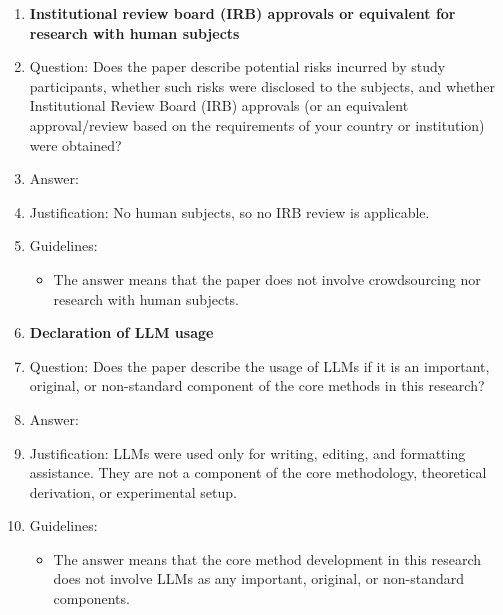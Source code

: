 \begin{enumerate}
\item {\bf Institutional review board (IRB) approvals or equivalent for research with human subjects}
    \item[] Question: Does the paper describe potential risks incurred by study participants, whether such risks were disclosed to the subjects, and whether Institutional Review Board (IRB) approvals (or an equivalent approval/review based on the requirements of your country or institution) were obtained?
    \item[] Answer: \answerNA{}
    \item[] Justification: No human subjects, so no IRB review is applicable.
    \item[] Guidelines:
    \begin{itemize}
        \item The answer \answerNA{} means that the paper does not involve crowdsourcing nor research with human subjects.
    \end{itemize}

\item {\bf Declaration of LLM usage}
    \item[] Question: Does the paper describe the usage of LLMs if it is an important, original, or non-standard component of the core methods in this research?
    \item[] Answer: \answerNA{}
    \item[] Justification: LLMs were used only for writing, editing, and formatting assistance. They are not a component of the core methodology, theoretical derivation, or experimental setup.
    \item[] Guidelines:
    \begin{itemize}
        \item The answer \answerNA{} means that the core method development in this research does not involve LLMs as any important, original, or non-standard components.
    \end{itemize}

\end{enumerate}
